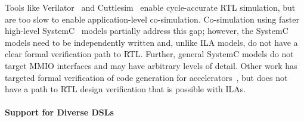 Tools like Verilator~\cite{verilator} and Cuttlesim~\cite{pitclaudel2021cuttlesim} enable cycle-accurate RTL simulation,
but are too slow to enable application-level co-simulation. Co-simulation using faster high-level SystemC~\cite{SystemC} models partially address this gap; however, the SystemC models need to be independently written and, unlike ILA models, do not have a clear formal verification path to RTL. Further, 
general SystemC models do not target MMIO interfaces and may have arbitrary levels of detail. 
Other work has targeted formal verification of code generation for accelerators~\cite{AtlPopl22,ExoPldi22}, but does not have a path to RTL design verification that is possible with ILAs. 
%

\paragraph{Support for Diverse DSLs}

